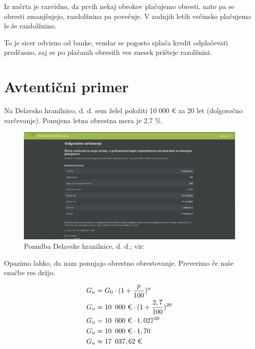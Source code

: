 \documentclass[12pt]{article}
\begin{document}
    Iz načrta je razvidno, da prvih nekaj obrokov plačujemo obresti, nato pa se obresti
    zmanjšujejo, razdolžnina pa povečuje. V zadnjih letih večinsko plačujemo le še razdolžnino.

    To je sicer odvisno od banke, vendar se pogosto splača kredit odplačevati predčasno, saj
    se po plačanih obresith ves znesek prišteje razolžnini. 
    \newpage

\section{Avtentični primer}
    Na Delavsko hranilnico, d. d. sem želel položiti 10 000 € za 20 let (dolgoročno varčevanje).
    Ponujena letna obrestna mera je 2,7 \%. \\

    \begin{figure}[h!]
        \includegraphics[width=\textwidth]{slike/2023-11-28_18-36.png}
        \caption{Ponudba Delavske hranilnice, d. d.; vir: \cite{DH}}
    \end{figure}

    Opazimo lahko, da nam ponujajo obrestno obrestovanje. Preverimo če naše enačbe res držjo.

    \begin{equation}
        \begin{split}
            G_n & = G_0 \cdot (1 + \frac{p}{100})^n \\
            G_n & = 10 \enskip 000 \text{ €} \cdot (1 + \frac{2,7}{100})^{20} \\
            G_n & = 10 \enskip 000 \text{ €} \cdot 1,027^{20} \\
            G_n & = 10 \enskip 000 \text{ €} \cdot 1,70 \\
            G_n & \approx 17 \enskip 037,62 \text{ €}
        \end{split}
    \end{equation}
\end{document}
